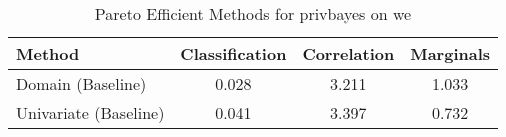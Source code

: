 \begin{table}[t!]
    \centering
    \caption{Pareto Efficient Methods for privbayes on we}
    \label{tab:pareto_efficient_methods_privbayes_we}
    \begin{tabular}{lccc}
    \toprule
    Method & Classification & Correlation & Marginals \\
    \midrule
    Domain (Baseline) & \cellcolor{gold!30}0.028 & \cellcolor{gold!30}3.211 & \cellcolor{silver!30}1.033 \\
    Univariate (Baseline) & \cellcolor{silver!30}0.041 & \cellcolor{silver!30}3.397 & \cellcolor{gold!30}0.732 \\
    \bottomrule
    \end{tabular}
\end{table}